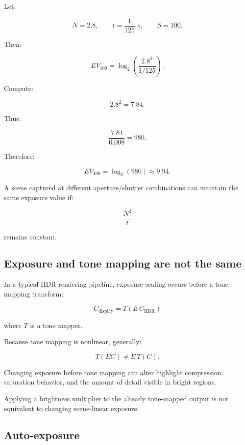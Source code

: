 \hypertarget{02-foundations-ii-ch036-numerical-example-v11.17.06}{}

Let:

\[ N=2.8,\qquad t=\frac1{125}\text{ s},\qquad S=100. \]

Then:

\[ EV_{100} = \log_2\left( \frac{2.8^2}{1/125} \right). \]

Compute:

\[ 2.8^2=7.84. \]

Thus:

\[ \frac{7.84}{0.008}=980. \]

Therefore:

\[ \boxed{ EV_{100}=\log_2(980)\approx9.94. } \]

A scene captured at different aperture/shutter combinations can maintain the same exposure value if:

\[ \frac{N^2}{t} \]

remains constant.

\subsection{Exposure and tone mapping are not the same}\label{02-foundations-ii-ch036-exposure-and-tone-mapping-are-not-the-same}

\hypertarget{02-foundations-ii-ch036-exposure-and-tone-mapping-are-not-the-same}{}

In a typical HDR rendering pipeline, exposure scaling occurs before a tone-mapping transform:

\[ \boxed{ C_{\mathrm{display}} = T(E\,C_{\mathrm{HDR}}) } \]

where \(T\) is a tone mapper.

Because tone mapping is nonlinear, generally:

\[ T(EC)\ne E\,T(C). \]

Changing exposure before tone mapping can alter highlight compression, saturation behavior, and the amount of detail visible in bright regions.

Applying a brightness multiplier to the already tone-mapped output is not equivalent to changing scene-linear exposure.

\subsection{Auto-exposure}\label{02-foundations-ii-ch036-auto-exposure}

\hypertarget{02-foundations-ii-ch036-auto-exposure}{}

